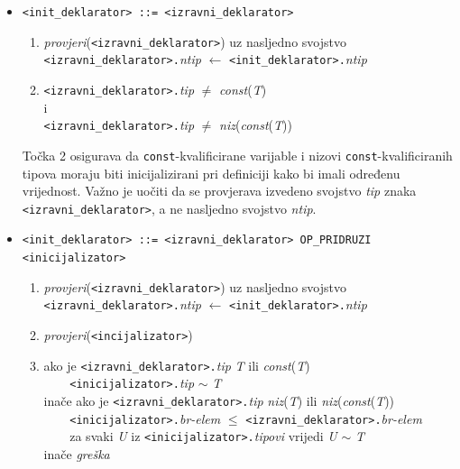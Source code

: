 \documentclass[times, 12pt, utf8]{book}
\begin{document}
\begin{itemize}

\item
\verb|<init_deklarator> ::= <izravni_deklarator>|
\begin{enumerate}
\item
\emph{provjeri}(\verb|<izravni_deklarator>|) uz nasljedno svojstvo\\
\verb|<izravni_deklarator>.|\emph{ntip} \(\leftarrow\) \verb|<init_deklarator>.|\emph{ntip}
\item
\verb|<izravni_deklarator>.|\emph{tip} \(\neq\) \emph{const}(\emph{T})\\
i\\
\verb|<izravni_deklarator>.|\emph{tip} \(\neq\) \emph{niz}(\emph{const}(\emph{T}))\\
\end{enumerate}

Točka 2 osigurava da \verb|const|-kvalificirane varijable i nizovi \verb|const|-kvalificiranih tipova moraju biti inicijalizirani pri definiciji kako bi imali određenu vrijednost.
Važno je uočiti da se provjerava izvedeno svojstvo \emph{tip} znaka \verb|<izravni_deklarator>|, a ne nasljedno svojstvo \emph{ntip}.

\item
\verb|<init_deklarator> ::= <izravni_deklarator> OP_PRIDRUZI <inicijalizator>|
\begin{enumerate}
\item
\emph{provjeri}(\verb|<izravni_deklarator>|) uz nasljedno svojstvo\\
\verb|<izravni_deklarator>.|\emph{ntip} \(\leftarrow\) \verb|<init_deklarator>.|\emph{ntip}
\item
\emph{provjeri}(\verb|<incijalizator>|)
\item
ako je \verb|<izravni_deklarator>.|\emph{tip} \emph{T} ili \emph{const}(\emph{T})\\
\verb|    <inicijalizator>.|\emph{tip} \(\sim\) \emph{T}\\
inače ako je \verb|<izravni_deklarator>.|\emph{tip} \emph{niz}(\emph{T}) ili \emph{niz}(\emph{const}(\emph{T}))\\
\verb|    <inicijalizator>.|\emph{br-elem} \(\le\) \verb|<izravni_deklarator>.|\emph{br-elem}\\
\verb|    |za svaki \emph{U} iz \verb|<inicijalizator>.|\emph{tipovi} vrijedi \emph{U} \(\sim\) \emph{T}\\
inače \emph{greška}
\end{enumerate}


\end{itemize}
\end{document}
